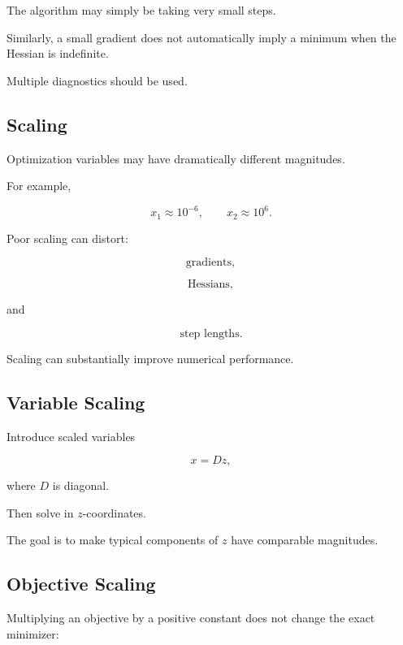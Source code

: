 The algorithm may simply be taking very small steps.

Similarly, a small gradient does not automatically imply a minimum when the
Hessian is indefinite.

Multiple diagnostics should be used.

\subsection{Scaling}
\label{subsec:numerical-optimization-scaling}

Optimization variables may have dramatically different magnitudes.

For example,

\[
x_1
\approx10^{-6},
\qquad
x_2
\approx10^6.
\]

Poor scaling can distort:

\[
\boxed{
\text{gradients},
}
\]

\[
\boxed{
\text{Hessians},
}
\]

and

\[
\boxed{
\text{step lengths}.
}
\]

Scaling can substantially improve numerical performance.

\subsection{Variable Scaling}
\label{subsec:variable-scaling}

Introduce scaled variables

\[
\boxed{
x=Dz,
}
\]

where \(D\) is diagonal.

Then solve in \(z\)-coordinates.

The goal is to make typical components of \(z\) have comparable
magnitudes.

\subsection{Objective Scaling}
\label{subsec:objective-scaling}

Multiplying an objective by a positive constant does not change the exact
minimizer:

